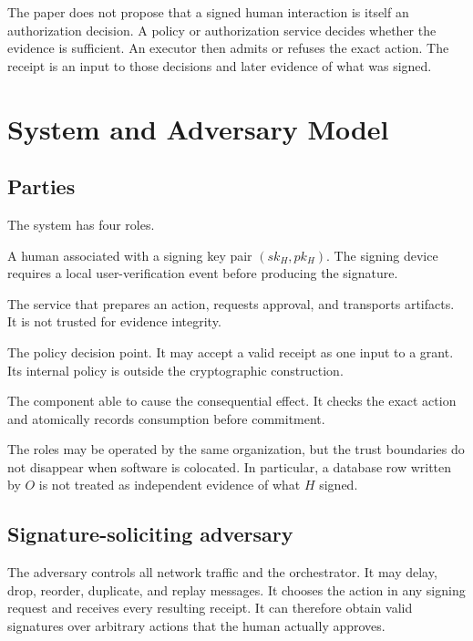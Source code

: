 \documentclass[10.5pt]{article}
\begin{document}
The paper does not propose that a signed human interaction is itself an
authorization decision. A policy or authorization service decides whether the
evidence is sufficient. An executor then admits or refuses the exact action. The
receipt is an input to those decisions and later evidence of what was signed.

\section{System and Adversary Model}

\subsection{Parties}

The system has four roles.

\begin{description}[leftmargin=2.5cm,style=nextline]
\item[Approver $H$] A human associated with a signing key pair
$(sk_H,pk_H)$. The signing device requires a local user-verification event before
producing the signature.
\item[Orchestrator $O$] The service that prepares an action, requests approval,
and transports artifacts. It is not trusted for evidence integrity.
\item[Authorization service $A$] The policy decision point. It may accept a valid
receipt as one input to a grant. Its internal policy is outside the cryptographic
construction.
\item[Executor $X$] The component able to cause the consequential effect. It
checks the exact action and atomically records consumption before commitment.
\end{description}

The roles may be operated by the same organization, but the trust boundaries do
not disappear when software is colocated. In particular, a database row written
by $O$ is not treated as independent evidence of what $H$ signed.

\subsection{Signature-soliciting adversary}

The adversary controls all network traffic and the orchestrator. It may delay,
drop, reorder, duplicate, and replay messages. It chooses the action in any
signing request and receives every resulting receipt. It can therefore obtain
valid signatures over arbitrary actions that the human actually approves.
\end{document}
